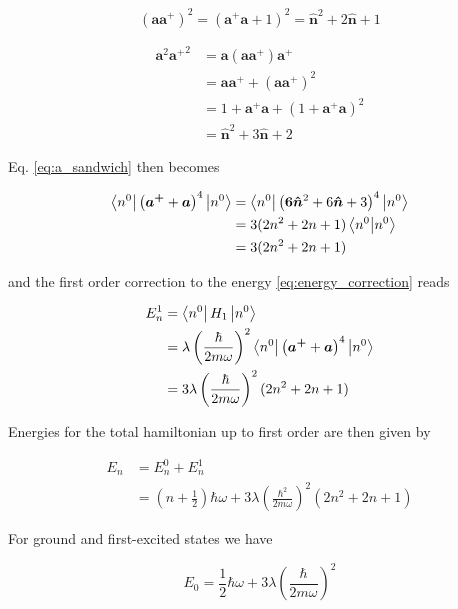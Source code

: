 \documentclass{article}
\begin{document}
\begin{equation}
(\bm{a} \bm{a^+})^2 = (\bm{a^+} \bm{a} + 1)^2 = \bm{ \hat{n} }^2 + 2 \bm{ \hat{n} } + 1
\end{equation}

\begin{align}
\bm{a}^2 {\bm{a^+}}^2 & = \bm{a} (\bm{a} \bm{a^+}) \bm{a^+} \nonumber \\
& = \bm{a} \bm{a^+} + (\bm{a} \bm{a^+})^2 \nonumber \\
& = 1 + \bm{a^+} \bm{a} + (1 + \bm{a^+} \bm{a})^2 \nonumber \\
& = \bm{ \hat{n} }^2 + 3 \bm{ \hat{n} } + 2
\end{align}

Eq. \eqref{eq:a_sandwich} then becomes


\begin{align}
\bra{n^0} \left( \bm{a^+} + \bm{a} \right)^4 \ket{n^0} & = \bra{n^0} \left( \bm{ 6 \hat{n} }^2 + 6 \bm{ \hat{n} } + 3 \right)^4 \ket{n^0} \nonumber \\
& = 3 (2n^2 + 2n +1) \braket{n^0}{n^0} \nonumber \\
& = 3(2n^2 + 2n +1)
\end{align}

and the first order correction to the energy \eqref{eq:energy_correction} reads

\begin{align}
\label{eq:x4correction}
E_n^1 & = \bra{n^0} H_1 \ket{n^0} \nonumber \\
& = \lambda \left( \frac{\hbar}{2m \omega} \right)^2 \bra{n^0} \left( \bm{a^+} + \bm{a} \right)^4 \ket{n^0} \nonumber \\
& = 3 \lambda \left( \frac{\hbar}{2m \omega} \right)^2 (2n^2 + 2n +1)
\end{align}

Energies for the total hamiltonian up to first order are then given by

\begin{align}
E_n & = E_n^0 + E_n^1 \nonumber \\
& = \left( n + \frac{1}{2} \right) \hbar \omega + 3 \lambda \left( \frac{\hbar^2}{2m\omega} \right)^2 (2n^2 + 2n +1)
\end{align}

For ground and first-excited states we have

\begin{equation}
E_0 = \frac{1}{2} \hbar \omega + 3 \lambda \left( \frac{\hbar}{2m\omega} \right)^2
\end{equation}
\end{document}
